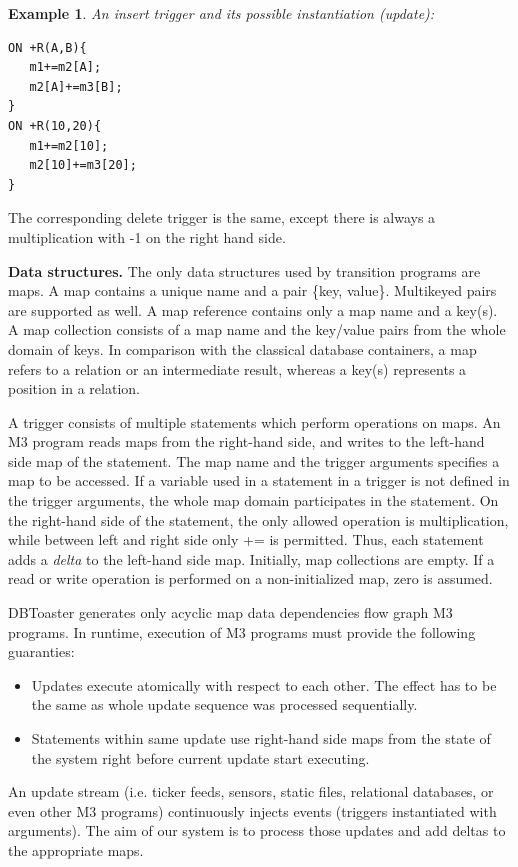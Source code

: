 \documentclass{sig-semester}
\newtheorem{example}[theorem]{Example}
\def\M3{M3\xspace}
\begin{document}
\begin{example} \em
\label{ex:simpleTrigger}
An insert trigger and its possible instantiation (update):
\begin{verbatim}
ON +R(A,B){
   m1+=m2[A];
   m2[A]+=m3[B];
}
ON +R(10,20){
   m1+=m2[10];
   m2[10]+=m3[20];
} 
\end{verbatim}
\end{example}
The corresponding delete trigger is the same, except there is always a multiplication with -1 on the right hand side.

\textbf{Data structures.} The only data structures used by transition programs are maps. A map contains a unique name and a pair \{key, value\}. Multikeyed pairs are supported as well. A map reference contains only a map name and a key(s). A map collection consists of a map name and the key/value pairs from the whole domain of keys. In comparison with the classical database containers, a map refers to a relation or an intermediate result, whereas a key(s) represents a position in a relation.

A trigger consists of multiple statements which perform operations on maps. An \M3 program reads maps from the right-hand side, and writes to the left-hand side map of the statement. The map name and the trigger arguments specifies a map to be accessed. If a variable used in a statement in a trigger is not defined in the trigger arguments, the whole map domain participates in the statement. On the right-hand side of the statement, the only allowed operation is multiplication, while between left and right side only += is permitted. Thus, each statement adds a \textit{delta} to the left-hand side map. Initially, map collections are empty. If a read or write operation is performed on a non-initialized map, zero is assumed.

DBToaster generates only acyclic map data dependencies flow graph \M3 programs. In runtime, execution of \M3 programs must provide the following guaranties:
\begin{itemize}
 \item Updates execute atomically with respect to each other. The effect has to be the same as whole update sequence was processed sequentially.
 \item Statements within same update use right-hand side maps from the state of the system right before current update start executing.
\end{itemize}

An update stream (i.e. ticker feeds, sensors, static files, relational databases, or even other \M3 programs) continuously injects events (triggers instantiated with arguments). The aim of our system is to process those updates and add deltas to the appropriate maps.
\end{document}
